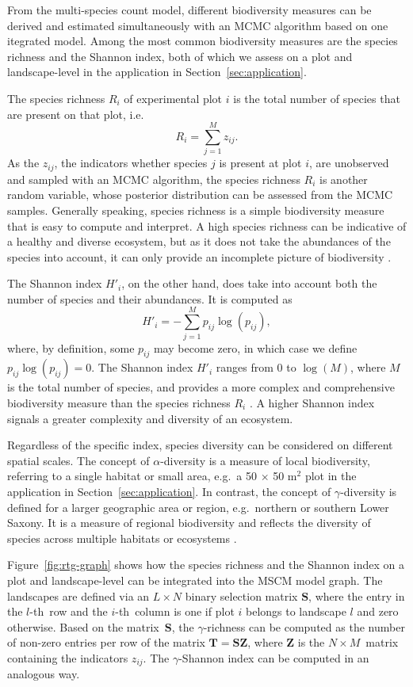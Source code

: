 \documentclass{article}
\newcommand{\Smat}{\mathbf{S}}
\newcommand{\Tmat}{\mathbf{T}}
\newcommand{\Zmat}{\mathbf{Z}}
\begin{document}
From the multi-species count model, different biodiversity measures can be derived and estimated simultaneously with an MCMC algorithm based on one itegrated model. Among the most common biodiversity measures are the species richness and the Shannon index, both of which we assess on a plot and landscape-level in the application in Section~\ref{sec:application}.

The species richness $R_i$ of experimental plot $i$ is the total number of species that are present on that plot, i.e.
$$R_i = \sum_{j=1}^M z_{ij}.$$
As the $z_{ij}$, the indicators whether species $j$ is present at plot $i$, are unobserved and sampled with an MCMC algorithm, the species richness $R_i$ is another random variable, whose posterior distribution can be assessed from the MCMC samples. Generally speaking, species richness is a simple biodiversity measure that is easy to compute and interpret. A high species richness can be indicative of a healthy and diverse ecosystem, but as it does not take the abundances of the species into account, it can only provide an incomplete picture of biodiversity \citep{hillDiversity1973, colwellBiodiversity2009}.

The Shannon index $H'_i$, on the other hand, does take into account both the number of species and their abundances. It is computed as
$$H'_i = -\sum_{j=1}^M p_{ij} \log(p_{ij}),$$
where, by definition, some $p_{ij}$ may become zero, in which case we define $p_{ij} \log(p_{ij}) = 0$. The Shannon index $H'_i$ ranges from 0 to $\log(M)$, where $M$ is the total number of species, and provides a more complex and comprehensive biodiversity measure than the species richness $R_i$ \citep{shannonMathematical1948}. A higher Shannon index signals a greater complexity and diversity of an ecosystem.

Regardless of the specific index, species diversity can be considered on different spatial scales. The concept of $\alpha$-diversity is a measure of local biodiversity, referring to a single habitat or small area, e.g.~a 50 $\times$ 50 m$^2$ plot in the application in Section~\ref{sec:application}. In contrast, the concept of $\gamma$-diversity is defined for a larger geographic area or region, e.g.~northern or southern Lower Saxony. It is a measure of regional biodiversity and reflects the diversity of species across multiple habitats or ecosystems \citep{whittakerVegetation1960, whittakerScale2001}.

Figure~\ref{fig:rtg-graph} shows how the species richness and the Shannon index on a plot and landscape-level can be integrated into the MSCM model graph. The landscapes are defined via an $L \times N$ binary selection matrix $\Smat$, where the entry in the $l$-th~row and the $i$-th~column is one if plot $i$ belongs to landscape $l$ and zero otherwise. Based on the matrix~$\Smat$, the $\gamma$-richness can be computed as the number of non-zero entries per row of the matrix $\Tmat = \Smat\Zmat$, where $\Zmat$ is the $N \times M$~matrix containing the indicators $z_{ij}$. The $\gamma$-Shannon index can be computed in an analogous way.
\end{document}
